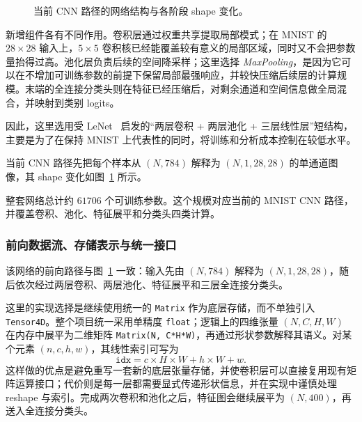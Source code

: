 \documentclass[a4paper,11pt,oneside]{article}
\begin{document}
\begin{figure}[H]
\caption{当前 CNN 路径的网络结构与各阶段 shape 变化。}
\label{fig:cnn_architecture_flow}
\end{figure}

新增组件各有不同作用。卷积层通过权重共享提取局部模式；在 MNIST 的 \(28\times28\) 输入上，\(5\times5\) 卷积核已经能覆盖较有意义的局部区域，同时又不会把参数量抬得过高。池化层负责后续的空间降采样；这里选择 \emph{MaxPooling}，是因为它可以在不增加可训练参数的前提下保留局部最强响应，并较快压缩后续层的计算规模。末端的全连接分类头则在特征已经压缩后，对剩余通道和空间信息做全局混合，并映射到类别 logits。

因此，这里选用受 LeNet~\cite{lecun1998} 启发的“两层卷积 + 两层池化 + 三层线性层”短结构，主要是为了在保持 MNIST 上代表性的同时，将训练和分析成本控制在较低水平。

当前 CNN 路径先把每个样本从 $(N,784)$ 解释为 $(N,1,28,28)$ 的单通道图像，其 shape 变化如图~\ref{fig:cnn_architecture_flow} 所示。

整套网络总计约 $61706$ 个可训练参数。这个规模对应当前的 MNIST CNN 路径，并覆盖卷积、池化、特征展平和分类头四类计算。

\subsubsection{前向数据流、存储表示与统一接口}

该网络的前向路径与图~\ref{fig:cnn_architecture_flow} 一致：输入先由 $(N,784)$ 解释为 $(N,1,28,28)$，随后依次经过两层卷积、两层池化、特征展平和三层全连接分类头。

这里的实现选择是继续使用统一的 \texttt{Matrix} 作为底层存储，而不单独引入 \texttt{Tensor4D}。整个项目统一采用单精度 \texttt{float}；逻辑上的四维张量 $(N,C,H,W)$ 在内存中展平为二维矩阵 \texttt{Matrix(N, C*H*W)}，再通过形状参数解释其语义。对某个元素 $(n,c,h,w)$，其线性索引可写为
\[
\texttt{idx} = c \times H \times W + h \times W + w.
\]
这样做的优点是避免重写一套新的底层张量存储，并使卷积层可以直接复用现有矩阵运算接口；代价则是每一层都需要显式传递形状信息，并在实现中谨慎处理 reshape 与索引。完成两次卷积和池化之后，特征图会继续展平为 $(N,400)$，再送入全连接分类头。
\end{document}
